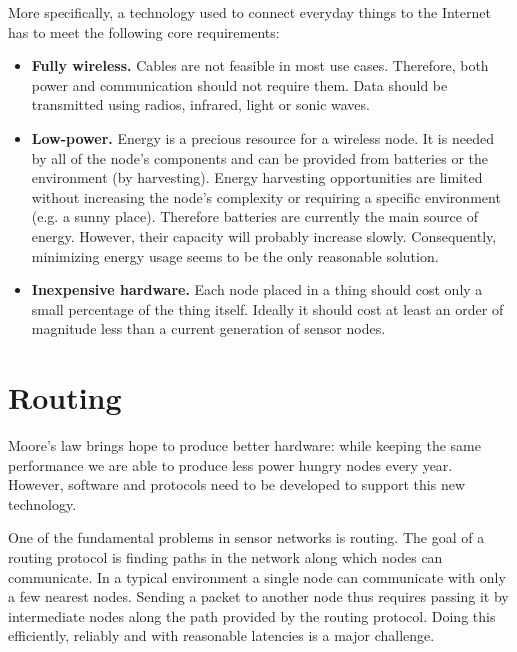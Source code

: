 More specifically, a technology used to connect everyday things to the Internet has to meet the following core requirements:
\begin{itemize}
  \item \textbf{Fully wireless.} Cables are not feasible in most use cases. Therefore, both power and communication should not require them.
Data should be transmitted using radios, infrared, light or sonic waves.
  \item \textbf{Low-power.} Energy is a precious resource for a wireless node.
It is needed by all of the node's components and can be provided from batteries or the environment (by harvesting).
Energy harvesting opportunities are limited without increasing the node's complexity or requiring a specific environment (e.g. a sunny place).
Therefore batteries are currently the main source of energy.
However, their capacity will probably increase slowly.
Consequently, minimizing energy usage seems to be the only reasonable solution.
  \item \textbf{Inexpensive hardware.} Each node placed in a thing should cost only a small percentage of the thing itself.
Ideally it should cost at least an order of magnitude less than a current generation of sensor nodes.
\end{itemize}

\section{Routing}
Moore's law brings hope to produce better hardware: while keeping the same performance we are able to produce less power hungry nodes every year.
However, software and protocols need to be developed to support this new technology.

One of the fundamental problems in sensor networks is routing.
The goal of a routing protocol is finding paths in the network along which nodes can communicate.
In a typical environment a single node can communicate with only a few nearest nodes.
Sending a packet to another node thus requires passing it by intermediate nodes along the path provided by the routing protocol.
Doing this efficiently, reliably and with reasonable latencies is a major challenge.

